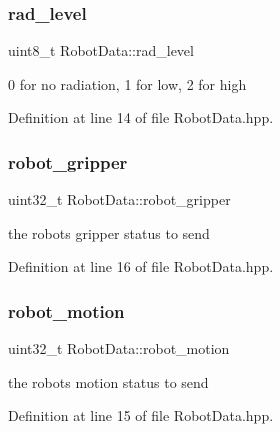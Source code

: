 \subsubsection{\texorpdfstring{rad\+\_\+level}{rad\_level}}
{\footnotesize\ttfamily uint8\+\_\+t Robot\+Data\+::rad\+\_\+level\hspace{0.3cm}{\ttfamily [private]}}



0 for no radiation, 1 for low, 2 for high 



Definition at line 14 of file Robot\+Data.\+hpp.

\mbox{\label{class_robot_data_a83aa1b34c8785aa24e1fc358e50dfc26}} 
\subsubsection{\texorpdfstring{robot\+\_\+gripper}{robot\_gripper}}
{\footnotesize\ttfamily uint32\+\_\+t Robot\+Data\+::robot\+\_\+gripper\hspace{0.3cm}{\ttfamily [private]}}



the robot\textquotesingle{}s gripper status to send 



Definition at line 16 of file Robot\+Data.\+hpp.

\mbox{\label{class_robot_data_aaa03c73d21d0d28a8b1b3d384d777a1e}} 
\subsubsection{\texorpdfstring{robot\+\_\+motion}{robot\_motion}}
{\footnotesize\ttfamily uint32\+\_\+t Robot\+Data\+::robot\+\_\+motion\hspace{0.3cm}{\ttfamily [private]}}



the robot\textquotesingle{}s motion status to send 



Definition at line 15 of file Robot\+Data.\+hpp.

\mbox{\label{class_robot_data_aa8c48e89aac7db2af1db825a7f3c1f30}} 
